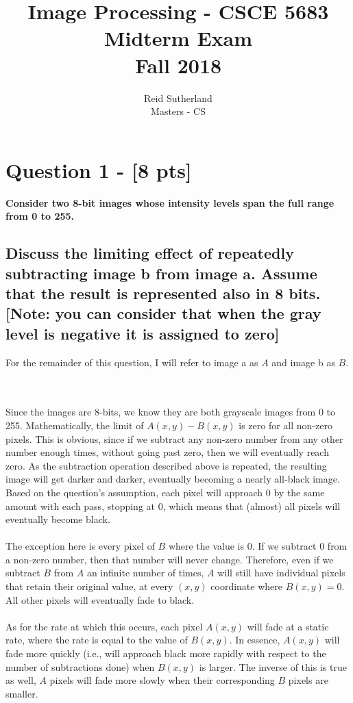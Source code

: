\documentclass[11pt]{article}
\begin{document}
\title{
	\large Image Processing - CSCE 5683\\
	Midterm Exam\\
	Fall 2018
}

\author{
	Reid Sutherland\\
	Masters - CS}

\maketitle



\section{Question 1 - [8 pts]}
\textbf{Consider two 8-bit images whose intensity levels span the full range from 0 to 255.}\\

\subsection{Discuss the limiting effect of repeatedly subtracting image b from image a. Assume that the result is represented also in 8 bits. [Note: you can consider that when the gray level is negative it is assigned to zero]}
\begin{it}
For the remainder of this question, I will refer to image a as $A$ and image b as $B$.
\end{it}\\
\\
Since the images are 8-bits, we know they are both grayscale images from 0 to 255. Mathematically, the limit of $A(x,y) - B(x,y)$ is zero for all non-zero pixels. This is obvious, since if we subtract any non-zero number from any other number enough times, without going past zero, then we will eventually reach zero. As the subtraction operation described above is repeated, the resulting image will get darker and darker, eventually becoming a nearly all-black image. Based on the question's assumption, each pixel will approach 0 by the same amount with each pass, stopping at 0, which means that (almost) all pixels will eventually become black.\\
\\
The exception here is every pixel of $B$ where the value is 0. If we subtract 0 from a non-zero number, then that number will never change. Therefore, even if we subtract $B$ from $A$ an infinite number of times, $A$ will still have individual pixels that retain their original value, at every $(x, y)$ coordinate where $B(x, y) = 0$. All other pixels will eventually fade to black.\\
\\
As for the rate at which this occurs, each pixel $A(x,y)$ will fade at a static rate, where the rate is equal to the value of $B(x,y)$. In essence, $A(x,y)$ will fade more quickly (i.e., will approach black more rapidly with respect to the number of subtractions done) when $B(x,y)$ is larger. The inverse of this is true as well, $A$ pixels will fade more slowly when their corresponding $B$ pixels are smaller.
\end{document}
